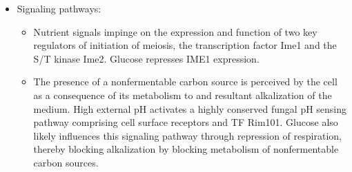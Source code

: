 \documentclass{report}
\begin{document}
\begin{itemize}
\begin{itemize}
	\item Signaling pathways: 	
	\begin{itemize}
		\item Nutrient signals impinge on the expression and function of two key regulators of initiation of meiosis, the transcription factor Ime1 and the S/T kinase Ime2. Glucose represses IME1 expression. 
		\item The presence of a nonfermentable carbon source is perceived by the cell as a consequence of its metabolism to  and resultant alkalization of the medium. High external pH activates a highly conserved fungal pH sensing pathway comprising cell surface receptors and TF Rim101. Glucose also likely influences this signaling pathway through repression of respiration, thereby blocking alkalization by blocking metabolism of nonfermentable carbon sources.
	\end{itemize}
\end{itemize}
\end{itemize}
\end{document}
